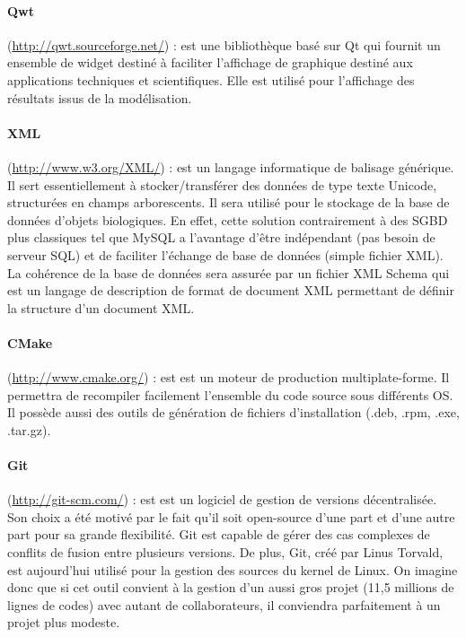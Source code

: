 \paragraph{Qwt}(\url{http://qwt.sourceforge.net/}) : est une
bibliothèque basé sur Qt qui fournit un ensemble de widget destiné à
faciliter l'affichage de graphique destiné aux applications techniques
et scientifiques. Elle est utilisé pour l'affichage des résultats
issus de la modélisation.

\paragraph{XML}(\url{http://www.w3.org/XML/}) : est un langage
informatique de balisage générique. Il sert essentiellement à
stocker/transférer des données de type texte Unicode, structurées en
champs arborescents. Il sera utilisé pour le stockage de la base de
données d'objets biologiques. En effet, cette solution contrairement à
des SGBD plus classiques tel que MySQL a l'avantage d'être indépendant
(pas besoin de serveur SQL) et de faciliter l'échange de base de
données (simple fichier XML). La cohérence de la base de données sera
assurée par un fichier XML Schema qui est un langage de description de
format de document XML permettant de définir la structure d'un
document XML.

\paragraph{CMake}(\url{http://www.cmake.org/}) : est est un \og moteur
de production \fg{} multiplate-forme. Il permettra de recompiler
facilement l'ensemble du code source sous différents OS. Il possède
aussi des outils de génération de fichiers d'installation (.deb, .rpm,
.exe, .tar.gz).

\paragraph{Git}(\url{http://git-scm.com/}) : est est un logiciel de
gestion de versions décentralisée. Son choix a été motivé par le fait
qu'il soit open-source d'une part et d'une autre part pour sa grande
flexibilité. Git est capable de gérer des cas complexes de conflits de
fusion entre plusieurs versions. De plus, Git, créé par Linus Torvald,
est aujourd'hui utilisé pour la gestion des sources du kernel de
Linux. On imagine donc que si cet outil convient à la gestion d'un
aussi gros projet (11,5 millions de lignes de codes) avec autant de
collaborateurs, il conviendra parfaitement à un projet plus modeste.

